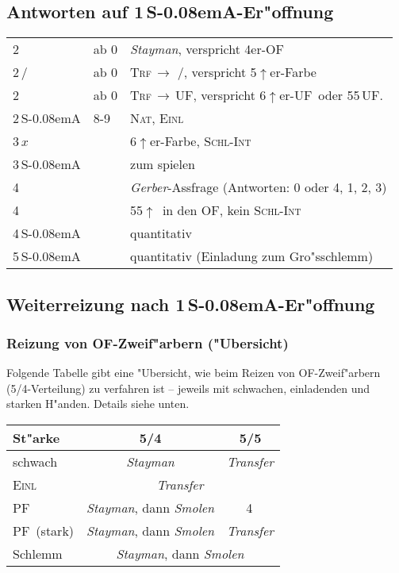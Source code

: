 \documentclass[11pt,german,twocolumn]{scrartcl}
\renewcommand{\Cl}{{\color{ClColor}{$\clubsuit$}}}
\renewcommand{\Di}{{\color{DiColor}{$\vardiamondsuit$}}}
\renewcommand{\He}{{\color{HeColor}{$\varheartsuit$}}}
\renewcommand{\Sp}{{\color{SpColor}{$\spadesuit$}}}
\def\pik{\,\Sp}
\def\coe{\,\He}
\def\kar{\,\Di}
\def\tre{\,\Cl}
\def\pi{\Sp}
\def\co{\He}
\def\ra{$\rightarrow$}
\def\pl{$\uparrow$}
\def\uf{\textsf{\,UF}}
\def\ufa{\textsf{UF}}
\def\ofa{\textsf{OF}}
\def\SA{\textsf{\,S\kern-0.08emA}}
\newcommand{\conv}[1]{\emph{#1}}
\def\nat{\textsc{Nat}}
\def\pf{\textsc{PF}}
\def\inv{\textsc{Einl}}
\def\xfer{\textsc{Trf}}
\def\xferto{\xfer\,\ra\,}
\def\slamint{\textsc{Schl-Int}}
\newcommand\bidins[1]%
{%
\begin{flushleft}
\begin{tabularx}{\columnwidth}{llX}%
#1
\end{tabularx}%
\end{flushleft}
}
\begin{document}
\subsection{Antworten auf 1\SA-Er"offnung}
\bidins{%
2\tre & ab 0 & \conv{Stayman}, verspricht 4er-\ofa\\
2\kar/\co & ab 0 & \xferto\coe/\pi, verspricht
5\pl{}er-Farbe\\
2\pik & ab 0 & \xferto\ufa, verspricht 6\pl{}er-\ufa\ oder
55\uf.\\
2\SA & 8-9 & \nat, \inv\\
3\,$x$ && 6\pl{}er-Farbe, \slamint{}\\
3\SA && zum spielen\\
4\tre && \conv{Gerber}-Assfrage (Antworten: 0 oder 4, 1, 2, 3)\\
4\kar && 55\pl\ in den \ofa, kein \slamint{}\\
4\SA && quantitativ\\
5\SA && quantitativ (Einladung zum Gro"sschlemm)
}

\subsection{Weiterreizung nach 1\SA-Er"offnung}

\subsubsection{Reizung von \ofa-Zweif"arbern ("Ubersicht)}

Folgende Tabelle gibt eine "Ubersicht, wie beim Reizen von
\ofa-Zweif"arbern (5/4-Verteilung) zu verfahren ist -- jeweils mit
schwachen, einladenden und starken H"anden.  Details siehe unten.

\begin{tabular}[t]{|l|c|c|}
\hline
\textbf{St"arke} & \textbf{5/4} & \textbf{5/5}\\
\hline
\hline
schwach & \conv{Stayman} & \conv{Transfer}\\
\hline
\inv & \multicolumn{2}{c|}{\conv{Transfer}}\\
\hline
\pf & \conv{Stayman}, dann \conv{Smolen} & 4\kar\\
\hline
\pf\ (stark) & \conv{Stayman}, dann \conv{Smolen} & \conv{Transfer}\\
\hline
Schlemm & \multicolumn{2}{c|}{\conv{Stayman}, dann \conv{Smolen}}\\
\hline
\end{tabular}
\end{document}
